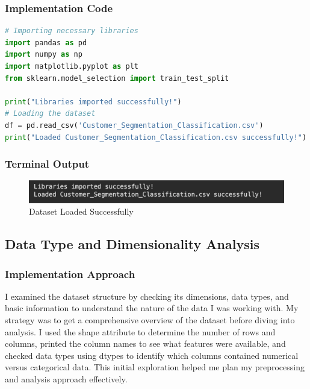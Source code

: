 \documentclass[12pt,a4paper]{article}
\begin{document}
\subsubsection{Implementation Code}
\begin{lstlisting}[language=Python, caption=Dataset Loading from CSV/XLSX Format]
# Importing necessary libraries
import pandas as pd
import numpy as np
import matplotlib.pyplot as plt
from sklearn.model_selection import train_test_split

print("Libraries imported successfully!")
# Loading the dataset
df = pd.read_csv('Customer_Segmentation_Classification.csv')
print("Loaded Customer_Segmentation_Classification.csv successfully!")
\end{lstlisting}

\subsubsection{Terminal Output}

\begin{figure}[h!]
\centering
    \includegraphics[width=\textwidth]{Figures/dataset_loading_output.png}
    \caption{Dataset Loaded Successfully}
    \label{fig:dataset_loading}
\end{figure}

\subsection{Data Type and Dimensionality Analysis}

\subsubsection{Implementation Approach}
I examined the dataset structure by checking its dimensions, data types, and basic information to understand the nature of the data I was working with. My strategy was to get a comprehensive overview of the dataset before diving into analysis. I used the shape attribute to determine the number of rows and columns, printed the column names to see what features were available, and checked data types using dtypes to identify which columns contained numerical versus categorical data. This initial exploration helped me plan my preprocessing and analysis approach effectively.
\end{document}

